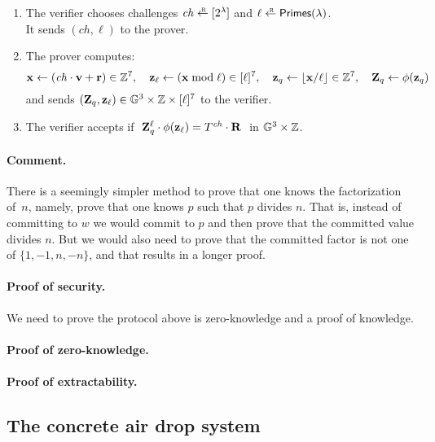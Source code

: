 \documentclass[11pt]{article}
\begin{document}
\begin{itemize}
\begin{enumerate}
\item The verifier chooses challenges $\mathit{ch} \rgets \range{2^\lambda}$
and $\ell \rgets \primes$. \\
It sends $(\mathit{ch}, \ell)$ to the prover.

\item The prover computes:
\[  \mathbf{x} \gets (\mathit{ch} \cdot \mathbf{v} + \mathbf{r}) \in \mathbb Z^7, \quad
    \mathbf{z}_\ell \gets (\mathbf{x} \bmod \ell) \in [{\ell}]^7, \quad
    \mathbf{z}_q \gets \lfloor \mathbf{x} / \ell \rfloor \in \mathbb Z^7, \quad
    \mathbf{Z}_q \gets \phi(\mathbf{z}_q)  
\]
and sends $(\mathbf{Z}_q, \mathbf{z}_\ell) \in \mathbb G^3 \times \mathbb Z \times [{\ell}]^7$ 
to the verifier. 

\item The verifier accepts if 
$\ \mathbf{Z}_q^\ell \cdot \phi(\mathbf{z}_\ell) = T^\mathit{ch} \cdot \mathbf{R}\ $ in 
$\mathbb G^3 \times \mathbb Z$.
\end{enumerate}
\end{itemize}

\paragraph{Comment.}
There is a seemingly simpler method to prove that one knows the
factorization of~$n$, namely, prove that one knows $p$ such that $p$
divides $n$.  That is, instead of committing to $w$ we would commit to
$p$ and then prove that the committed value divides $n$. But we would
also need to prove that the committed factor is not one of 
$\{1, -1, n, -n\}$, and that results in a longer proof.

\paragraph{Proof of security.}
We need to prove the protocol above is zero-knowledge and a 
proof of knowledge. 

\paragraph{Proof of zero-knowledge.}


\paragraph{Proof of extractability.}



\subsection{The concrete air drop system}
\end{document}

